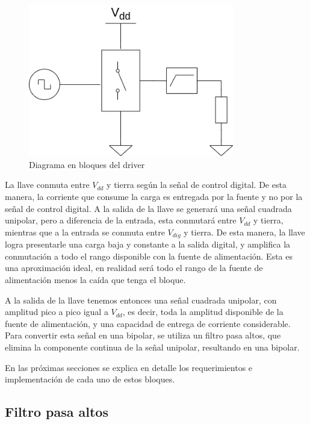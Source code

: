 \begin{figure}[tbp]
    \centering
    \includegraphics[width=0.8\textwidth]{images/driver.drawio.png}
    \caption{Diagrama en bloques del driver}
    \label{fig:driver_block_diagram}
\end{figure}

La llave conmuta entre $V_{dd}$ y tierra según la señal de control digital. De
esta manera, la corriente que consume la carga es entregada por la fuente y no
por la señal de control digital. A la salida de la llave se generará una señal
cuadrada unipolar, pero a diferencia de la entrada, esta conmutará entre
$V_{dd}$ y tierra, mientras que a la entrada se conmuta entre $V_{dig}$ y
tierra. De esta manera, la llave logra presentarle una carga baja y constante a
la salida digital, y amplifica la conmutación a todo el rango disponible con la
fuente de alimentación. Esta es una aproximación ideal, en realidad será todo el
rango de la fuente de alimentación menos la caída que tenga el bloque.

A la salida de la llave tenemos entonces una señal cuadrada unipolar, con
amplitud pico a pico igual a $V_{dd}$, es decir, toda la amplitud disponible de
la fuente de alimentación, y una capacidad de entrega de corriente considerable.
Para convertir esta señal en una bipolar, se utiliza un filtro pasa altos, que
elimina la componente continua de la señal unipolar, resultando en una bipolar.

En las próximas secciones se explica en detalle los requerimientos e
implementación de cada uno de estos bloques.

\subsection{Filtro pasa altos}

